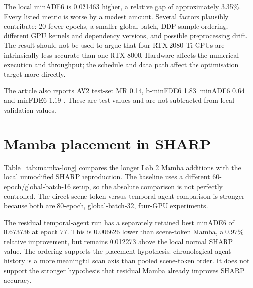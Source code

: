 The local minADE6 is 0.021463 higher, a relative gap of approximately 3.35\%. Every listed metric is worse by a modest amount. Several factors plausibly contribute: 20 fewer epochs, a smaller global batch, DDP sample ordering, different GPU kernels and dependency versions, and possible preprocessing drift. The result should not be used to argue that four RTX 2080 Ti GPUs are intrinsically less accurate than one RTX 8000. Hardware affects the numerical execution and throughput; the schedule and data path affect the optimisation target more directly.

The article also reports AV2 test-set MR 0.14, b-minFDE6 1.83, minADE6 0.64 and minFDE6 1.19 \cite{prutsch2026sharp}. These are test values and are not subtracted from local validation values.

\section{Mamba placement in SHARP}

Table~\ref{tab:mamba-long} compares the longer Lab 2 Mamba additions with the local unmodified SHARP reproduction. The baseline uses a different 60-epoch/global-batch-16 setup, so the absolute comparison is not perfectly controlled. The direct scene-token versus temporal-agent comparison is stronger because both are 80-epoch, global-batch-32, four-GPU experiments.

\begin{table}[htbp]
\centering
\caption{Longer Lab 2 SHARP and Mamba results on AV2 validation.}
\label{tab:mamba-long}
\end{table}

The residual temporal-agent run has a separately retained best minADE6 of 0.673736 at epoch 77. This is 0.006626 lower than scene-token Mamba, a 0.97\% relative improvement, but remains 0.012273 above the local normal SHARP value. The ordering supports the placement hypothesis: chronological agent history is a more meaningful scan axis than pooled scene-token order. It does not support the stronger hypothesis that residual Mamba already improves SHARP accuracy.

